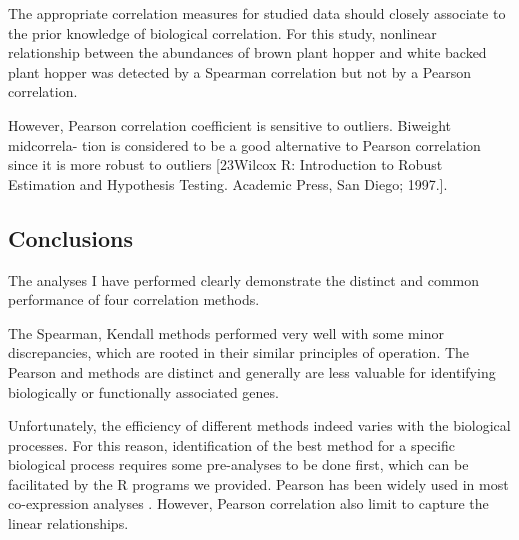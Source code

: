 The appropriate correlation measures for studied data should closely associate to the prior knowledge of biological correlation. For this study, nonlinear relationship between the abundances of brown plant hopper and white backed plant hopper was detected by a Spearman correlation but not by a Pearson correlation.

However, Pearson correlation coefficient is sensitive to outliers. Biweight midcorrela- tion is considered to be a good alternative to Pearson correlation since it is more robust to outliers [23Wilcox R: Introduction to Robust Estimation and Hypothesis Testing. Academic Press, San Diego; 1997.].

\subsection{Conclusions}

The analyses I have performed clearly demonstrate the distinct and common performance of four correlation methods. 

The Spearman, Kendall methods performed very well with some minor discrepancies, which are rooted in their similar principles of operation. The Pearson and methods are distinct and generally are less valuable for identifying biologically or functionally associated genes. 

Unfortunately, the efficiency of different methods indeed varies with the biological processes. For this reason, identification of the best method for a specific biological process requires some pre-analyses to be done first, which can be facilitated by the R programs we provided.
Pearson has been widely used in most co-expression analyses \citep{Zhang_2005_General}. However, Pearson correlation also limit to capture the linear relationships. 
	